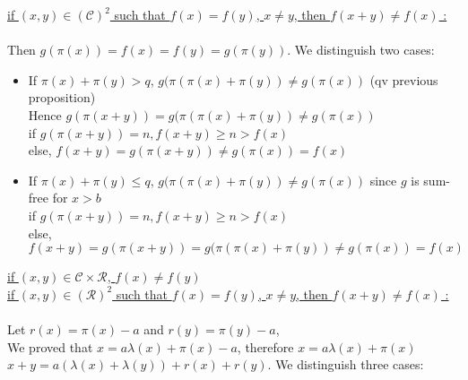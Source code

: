 \underline{if \((x,y) \in (\mathcal{C})^2\) such that \(f(x)=f(y)\), \(x \neq y\), then \(f(x+y)\neq f(x)\)  :}\\
\\Then  \(g(\pi(x))=f(x)=f(y)=g(\pi(y))\). We distinguish two cases:

\begin{itemize}
\item If \(\pi(x)+\pi(y)>q\), \(g(\pi(\pi(x)+\pi(y)) \neq g(\pi(x))\) (qv previous proposition)
\\Hence \(g(\pi(x+y))= g(\pi(\pi(x)+\pi(y))\neq g(\pi(x))\)
\\if \(g(\pi(x+y))=n, f(x+y)\geqslant n > f(x)\)
\\else, \(f(x+y)=g(\pi(x+y))\neq g(\pi(x))=f(x)\)
\item If  \(\pi(x)+\pi(y)\leqslant q\), \(g(\pi(\pi(x)+\pi(y)) \neq g(\pi(x))\) since \(g\) is sum-free for \(x>b\)
\\if \(g(\pi(x+y))=n, f(x+y)\geqslant n > f(x)\)
\\else, \(f(x+y)=g(\pi(x+y))=g(\pi(\pi(x)+\pi(y))\neq g(\pi(x))=f(x)\)


\end{itemize}



\underline{if \((x,y) \in \mathcal{C} \times \mathcal{R} \), \(f(x)\neq f(y)\)}\\

\underline{if \((x,y) \in (\mathcal{R})^2\) such that \(f(x)=f(y)\), \(x \neq y\), then \(f(x+y)\neq f(x)\)  :}\\
\\Let \(r(x)=\pi(x)-a\) and \(r(y)=\pi(y)-a\),
\\We proved that \(x=a\lambda(x)+\pi(x)-a\), therefore \(x=a\lambda(x)+\pi(x)\)
\\\(x+y=a(\lambda(x)+\lambda(y))+r(x)+r(y)\). We distinguish three cases:

